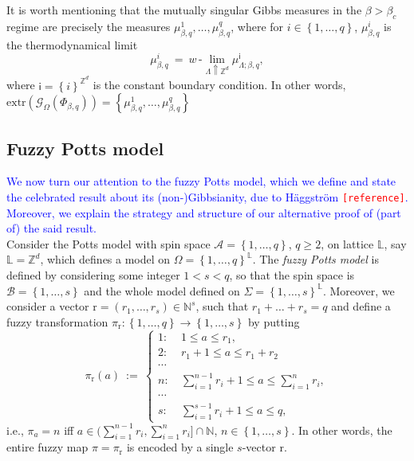 \documentclass[12pt]{article}
\newcommand{\A}{\mathcal{A}}
\newcommand{\B}{\mathcal{B}}
\newcommand{\G}{\mathcal{G}}
\renewcommand{\L}{\mathbb{L}}
\newcommand{\N}{\mathbb{N}}
\renewcommand{\r}{\mathrm{r}}
\newcommand{\Z}{\mathbb{Z}}
\newcommand{\set}[1]{\left\{#1\right\}}
\newcommand{\ra}{\rightarrow}
\newcommand{\1}{\mathbbm{1}}
\newcommand{\5}{\vspace{0.5cm}}
\theoremstyle{definition}
\begin{document}
It is worth mentioning that the mutually singular Gibbs measures in the $\beta>\beta_c$ regime are precisely the measures $\mu_{\beta,q}^1,\ldots,\mu_{\beta,q}^q$, where for $i\in\set{1,\ldots,q}$, $\mu_{\beta,q}^i$ is the thermodynamical limit
$$\mu_{\beta,q}^i ~=~ w\,\text{-}\!\lim_{\Lambda\Uparrow\Z^d}\mu_{\Lambda;\beta,q}^{\mathsf{i}},$$
where $\mathsf{i}=\set{i}^{\Z^d}$ is the constant boundary condition. In other words, $\mathrm{extr}(\G_{\Omega}(\Phi_{\beta,q}))=\set{\mu_{\beta,q}^1,\ldots,\mu_{\beta,q}^q}$


\subsection{Fuzzy Potts model}

\textcolor{blue}{We now turn our attention to the fuzzy Potts model, which we define and state the celebrated result about its (non-)Gibbsianity, due to H\"aggstr\"om \textcolor{red}{\texttt{[reference]}}. Moreover, we explain the strategy and structure of our alternative proof of (part of) the said result.} \\

Consider the Potts model with spin space $\A=\set{1,\ldots,q}$, $q\geq 2$, on lattice $\L$, say $\L=\Z^d$, which defines a model on $\Omega=\set{1,\ldots,q}^\L$. The \textit{fuzzy Potts model} is defined by considering some integer $1<s<q$, so that the spin space is $\B=\set{1,\ldots,s}$ and the whole model defined on $\Sigma=\set{1,\ldots,s}^\L$. Moreover, we consider a vector $\r=(r_1,\ldots,r_s)\in\N^s$, such that $r_1+\ldots+r_s=q$ and define a fuzzy transformation $\pi_\r:\set{1,\ldots,q}\ra\set{1,\ldots,s}$ by putting 
$$\pi_\r(a) ~:=~ \begin{cases}
1: ~&1\leq a\leq r_1,\\
2: ~&r_1+1\leq a\leq r_1+r_2 \\
\cdots \\
n: ~&\sum_{i=1}^{n-1} r_i + 1\leq a\leq \sum_{i=1}^n r_i,\\
\cdots \\
s: ~&\sum_{i=1}^{s-1}r_i + 1\leq a\leq q,
\end{cases}$$
i.e., $\pi_a=n$ iff $a\in(\sum_{i=1}^{n-1}r_i,\sum_{i=1}^n r_i]\cap \N$, $n\in\set{1,\ldots,s}$. In other words, the entire fuzzy map $\pi=\pi_\r$ is encoded by a single $s$-vector $\r$. \\
\end{document}
